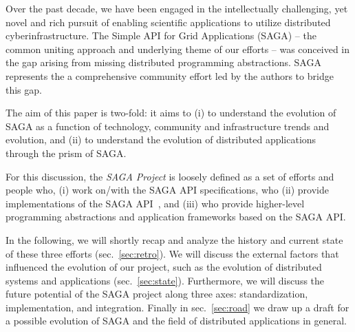 \documentclass{article}
\newcommand{\I}[1]{\textit{#1}}
\begin{document}
 Over the past decade, we have been engaged in the intellectually challenging,
 yet novel and rich pursuit of enabling scientific applications to utilize
 distributed cyberinfrastructure. The Simple API for Grid Applications (SAGA) --
 the common uniting approach and underlying theme of our efforts -- was
 conceived in the gap arising from missing distributed programming abstractions.
 SAGA represents the a comprehensive community effort led by the authors to
 bridge this gap.

 The aim of this paper is two-fold: it aims to (i) to understand the evolution
 of SAGA as a function of technology, community and infrastructure trends and
 evolution, and (ii) to understand the evolution of distributed applications
 through the prism of SAGA.

 For this discussion, the \I{SAGA Project} is loosely defined as a set of
 efforts and people who, (i) work on/with the SAGA API
 specifications\cite{ogf-gfd-90}, who (ii) provide implementations of the SAGA
 API~\cite{Kaiser:2006qp,jsaga,javasaga}, and (iii) who provide higher-level
 programming abstractions and application frameworks based on the SAGA
 API\cite{bigjob_cloudcom10}.

 In the following, we will shortly recap and analyze the history and current
 state of these three efforts (sec.~\ref{sec:retro}). We will discuss the
 external factors that influenced the evolution of our project, such as the
 evolution of distributed systems and applications (sec.~\ref{sec:state}).
 Furthermore, we will discuss the future potential of the SAGA project along
 three axes: standardization, implementation, and integration. Finally in
 sec.~\ref{sec:road} we draw up a draft for a possible evolution of SAGA and the
 field of distributed applications in general.

 

 
\end{document}
